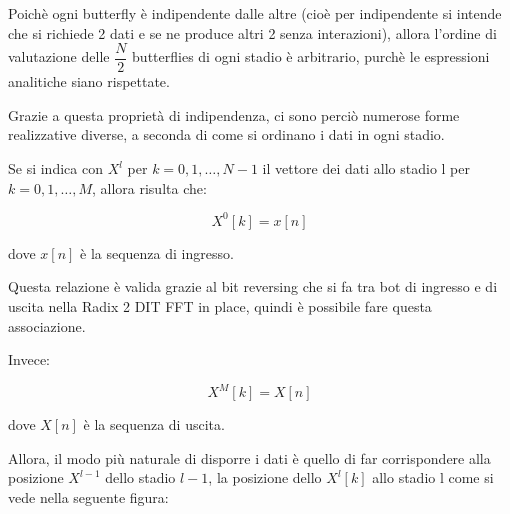 Poichè ogni butterfly è indipendente dalle altre (cioè per indipendente si intende che si richiede 2 dati e se ne produce altri 2 senza interazioni), 
allora l'ordine di valutazione delle $\dfrac{N}{2}$ butterflies di ogni stadio è arbitrario, 
purchè le espressioni analitiche siano rispettate. \newline 

Grazie a questa proprietà di indipendenza, ci sono perciò numerose forme realizzative diverse, a seconda di come si ordinano i dati in ogni stadio. \newline 

Se si indica con $X^{l}$ per $k = 0, 1, \dots, N - 1$  il vettore dei dati allo stadio l per $k = 0, 1, \dots, M$, allora risulta che: 

{
    \Large 
    \begin{equation}
        X^{0} \left[ k\right] 
        = 
        x \left[ n\right]
    \end{equation}
}

dove $x \left[ n\right]$ è la sequenza di ingresso. \newline 

\begin{tcolorbox}
Questa relazione è valida grazie al bit reversing che si fa tra bot di ingresso e di uscita nella Radix 2 DIT FFT in place, 
quindi è possibile fare questa associazione.     
\end{tcolorbox}

Invece: 

{
    \Large 
    \begin{equation}
        X^{M} \left[ k\right] 
        = 
        X \left[ n\right]
    \end{equation}
}

dove $X \left[ n\right]$ è la sequenza di uscita. \newline 

Allora, il modo più naturale di disporre i dati è quello di far corrispondere alla posizione $X^{l - 1}$ dello stadio $l - 1$, 
la posizione dello $X^{l} \left[ k\right]$ allo stadio l come si vede nella seguente figura: 

